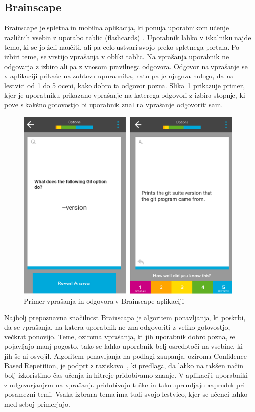 \documentclass[a4paper, 12pt]{book}
\begin{document}
\subsection{Brainscape}
Brainscape je spletna in mobilna aplikacija, ki ponuja uporabnikom učenje različnih vsebin z uporabo tablic (flashcards)~\cite{Brainscape}. Uporabnik lahko v iskalniku najde temo, ki se jo želi naučiti, ali pa celo ustvari svojo preko spletnega portala. Po izbiri teme, se vrstijo vprašanja v obliki tablic. Na vprašanja uporabnik ne odgovarja z izbiro ali pa z vnosom pravilnega odgovora. Odgovor na vprašanje se v aplikaciji prikaže na zahtevo uporabnika, nato pa je njegova naloga, da na lestvici od 1 do 5 oceni, kako dobro ta odgovor pozna. 
Slika~\ref{brainscape} prikazuje primer, kjer je uporabniku prikazano vprašanje na katerega odgovori z izbiro stopnje, ki pove s kakšno gotovostjo bi uporabnik znal na vprašanje odgovoriti sam.
\begin{figure}[H]
\centering
\includegraphics[height=0.7\textwidth]{slike/Brainscape}
\caption{Primer vprašanja in odgovora v Brainscape aplikaciji}\label{brainscape}
\end{figure}
\noindent Najbolj prepoznavna značilnost Brainscapa je algoritem ponavljanja, ki poskrbi, da se vprašanja, na katera uporabnik ne zna odgovoriti z veliko gotovostjo, večkrat ponovijo. Teme, oziroma vprašanja, ki jih uporabnik dobro pozna, se pojavljajo manj pogosto, tako se lahko uporabnik bolj osredotoči na vsebine, ki jih še ni osvojil. Algoritem ponavljanja na podlagi zaupanja, oziroma Confidence-Based Repetition, je podprt z raziskavo~\cite{cbr}, ki predlaga, da lahko na takšen način bolj izkoristimo čas učenja in hitreje pridobivamo znanje. V aplikaciji uporabniki z odgovarjanjem na vprašanja pridobivajo točke in tako spremljajo napredek pri posamezni temi. Vsaka izbrana tema ima tudi svojo lestvico, kjer se učenci lahko med seboj primerjajo.
\end{document}
